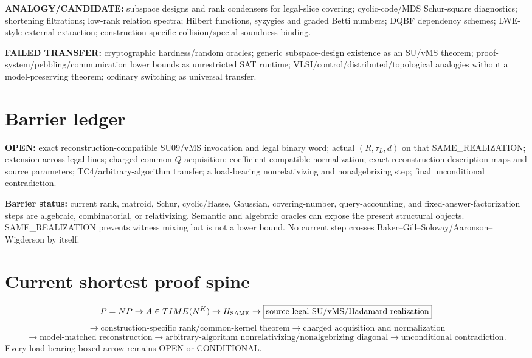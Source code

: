 \documentclass[11pt]{article}
\begin{document}
\textbf{ANALOGY/CANDIDATE:} subspace designs and rank condensers for legal-slice covering; cyclic-code/MDS Schur-square diagnostics; shortening filtrations; low-rank relation spectra; Hilbert functions, syzygies and graded Betti numbers; DQBF dependency schemes; LWE-style external extraction; construction-specific collision/special-soundness binding.

\textbf{FAILED TRANSFER:} cryptographic hardness/random oracles; generic subspace-design existence as an SU/vMS theorem; proof-system/pebbling/communication lower bounds as unrestricted SAT runtime; VLSI/control/distributed/topological analogies without a model-preserving theorem; ordinary switching as universal transfer.

\section*{Barrier ledger}
\textbf{OPEN:} exact reconstruction-compatible SU09/vMS invocation and legal binary word; actual \((R,\tau_L,d)\) on that SAME\_REALIZATION; extension across legal lines; charged common-\(Q\) acquisition; coefficient-compatible normalization; exact reconstruction description maps and source parameters; TC4/arbitrary-algorithm transfer; a load-bearing nonrelativizing and nonalgebrizing step; final unconditional contradiction.

\textbf{Barrier status:} current rank, matroid, Schur, cyclic/Hasse, Gaussian, covering-number, query-accounting, and fixed-answer-factorization steps are algebraic, combinatorial, or relativizing. Semantic and algebraic oracles can expose the present structural objects. SAME\_REALIZATION prevents witness mixing but is not a lower bound. No current step crosses Baker--Gill--Solovay/Aaronson--Wigderson by itself.

\section*{Current shortest proof spine}
\[
P=NP\to A\in TIME(N^K)\to H_{\rm SAME}
\to\boxed{\text{source-legal SU/vMS/Hadamard realization}}
\]
\[
\to\boxed{\text{construction-specific rank/common-kernel theorem}}
\to\boxed{\text{charged acquisition and normalization}}
\]
\[
\to\boxed{\text{model-matched reconstruction}}
\to\boxed{\text{arbitrary-algorithm nonrelativizing/nonalgebrizing diagonal}}
\to\boxed{\text{unconditional contradiction}}.
\]
Every load-bearing boxed arrow remains OPEN or CONDITIONAL.
\end{document}
